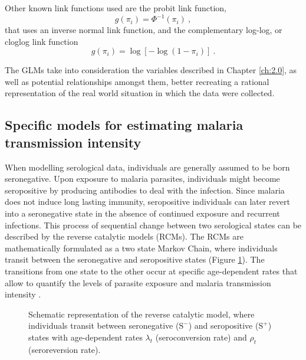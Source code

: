 Other known link functions used are the probit link function,
%
\begin{equation}
    \label{eq:probit}
    g(\pi_i)=\Phi^{-1}(\pi_i)\ ,
\end{equation}
%
\noindent
that uses an inverse normal link function, and the complementary log-log, or cloglog link function
%
\begin{equation}
    \label{eq:cloglog}
    g(\pi_i)=\log[-\log(1-\pi_i)]\ .
\end{equation}

The GLMs take into consideration the variables described in Chapter \ref{ch:2.0}, as well as potential relationships amongst them, better recreating a rational representation of the real world situation in which the data were collected.



\subsection{Specific models for estimating malaria transmission intensity}

When modelling serological data, individuals are generally assumed to be born seronegative.
Upon exposure to malaria parasites, individuals might become seropositive by producing antibodies to deal with the infection.
Since malaria does not induce long lasting immunity, seropositive individuals can later revert into a seronegative state in the absence of continued exposure and recurrent infections.
This process of sequential change between two serological states can be described by the reverse catalytic models (RCMs).
The RCMs are mathematically formulated as a two state Markov Chain, where individuals transit between the seronegative and seropositive states (Figure \ref{fig:M0}).
The transitions from one state to the other occur at specific age-dependent rates that allow to quantify the levels of parasite exposure and malaria transmission intensity \cite{muench1959catalytic}.

\begin{figure}[ht!]
    \center
    \scalebox{1.25}{}
    \caption[Schematic representation of the reverse catalytic model]{Schematic representation of the reverse catalytic model, where individuals transit between seronegative ($\text{S}^-$) and seropositive ($\text{S}^+$) states with age-dependent rates $\lambda_t$ (seroconversion rate) and $\rho_t$ (seroreversion rate).}
    \label{fig:M0}
\end{figure}

